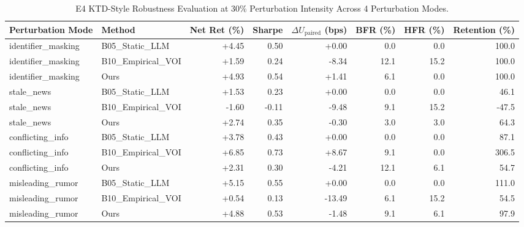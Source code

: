 \begin{table}[t]
\centering
\caption{E4 KTD-Style Robustness Evaluation at $30\%$ Perturbation Intensity Across 4 Perturbation Modes.}
\label{tab:e4_robustness}
\footnotesize
\begin{tabular}{llrrrrrr}
\toprule
Perturbation Mode & Method & Net Ret (\%) & Sharpe & $\Delta U_{\text{paired}}$ (bps) & BFR (\%) & HFR (\%) & Retention (\%) \\
\midrule
identifier\_masking & B05\_Static\_LLM & +4.45 & 0.50 & +0.00 & 0.0 & 0.0 & 100.0 \\
identifier\_masking & B10\_Empirical\_VOI & +1.59 & 0.24 & -8.34 & 12.1 & 15.2 & 100.0 \\
identifier\_masking & Ours & +4.93 & 0.54 & +1.41 & 6.1 & 0.0 & 100.0 \\
stale\_news & B05\_Static\_LLM & +1.53 & 0.23 & +0.00 & 0.0 & 0.0 & 46.1 \\
stale\_news & B10\_Empirical\_VOI & -1.60 & -0.11 & -9.48 & 9.1 & 15.2 & -47.5 \\
stale\_news & Ours & +2.74 & 0.35 & -0.30 & 3.0 & 3.0 & 64.3 \\
conflicting\_info & B05\_Static\_LLM & +3.78 & 0.43 & +0.00 & 0.0 & 0.0 & 87.1 \\
conflicting\_info & B10\_Empirical\_VOI & +6.85 & 0.73 & +8.67 & 9.1 & 0.0 & 306.5 \\
conflicting\_info & Ours & +2.31 & 0.30 & -4.21 & 12.1 & 6.1 & 54.7 \\
misleading\_rumor & B05\_Static\_LLM & +5.15 & 0.55 & +0.00 & 0.0 & 0.0 & 111.0 \\
misleading\_rumor & B10\_Empirical\_VOI & +0.54 & 0.13 & -13.49 & 6.1 & 15.2 & 54.5 \\
misleading\_rumor & Ours & +4.88 & 0.53 & -1.48 & 9.1 & 6.1 & 97.9 \\
\bottomrule
\end{tabular}
\end{table}
